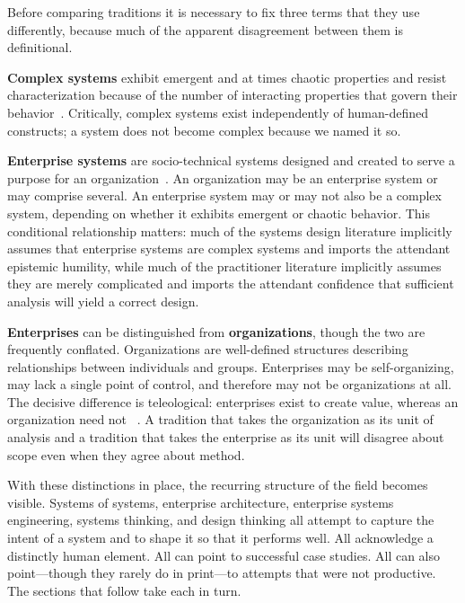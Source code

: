 \documentclass[11pt,a4paper]{article}
\begin{document}
Before comparing traditions it is necessary to fix three terms that they use
differently, because much of the apparent disagreement between them is
definitional.

\textbf{Complex systems} exhibit emergent and at times chaotic properties and
resist characterization because of the number of interacting properties that
govern their behavior~\citep{siddique2024}. Critically, complex systems exist
independently of human-defined constructs; a system does not become complex
because we named it so.

\textbf{Enterprise systems} are socio-technical systems designed and created to
serve a purpose for an organization~\citep{xu2016}. An organization may be an
enterprise system or may comprise several. An enterprise system may or may not
also be a complex system, depending on whether it exhibits emergent or chaotic
behavior. This conditional relationship matters: much of the systems design
literature implicitly assumes that enterprise systems are complex systems and
imports the attendant epistemic humility, while much of the practitioner
literature implicitly assumes they are merely complicated and imports the
attendant confidence that sufficient analysis will yield a correct design.

\textbf{Enterprises} can be distinguished from \textbf{organizations}, though
the two are frequently conflated. Organizations are well-defined structures
describing relationships between individuals and groups. Enterprises may be
self-organizing, may lack a single point of control, and therefore may not be
organizations at all. The decisive difference is teleological: enterprises exist
to create value, whereas an organization need not
~\citep{sebok_ese2024,kotze2016}. A tradition that takes the organization as its
unit of analysis and a tradition that takes the enterprise as its unit will
disagree about scope even when they agree about method.

With these distinctions in place, the recurring structure of the field becomes
visible. Systems of systems, enterprise architecture, enterprise systems
engineering, systems thinking, and design thinking all attempt to capture the
intent of a system and to shape it so that it performs well. All acknowledge a
distinctly human element. All can point to successful case studies. All can also
point---though they rarely do in print---to attempts that were not productive.
The sections that follow take each in turn.

\end{document}

